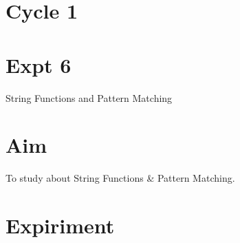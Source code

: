 \documentclass[13pt,oneside]{book}
\begin{document}
\section*{Cycle 1}
\section*{Expt 6}
\begin{center}
    \Large{String Functions and Pattern Matching}
\end{center}

\section*{Aim}
\large To study about String Functions \& Pattern Matching.

\section*{Expiriment}
\end{document}
